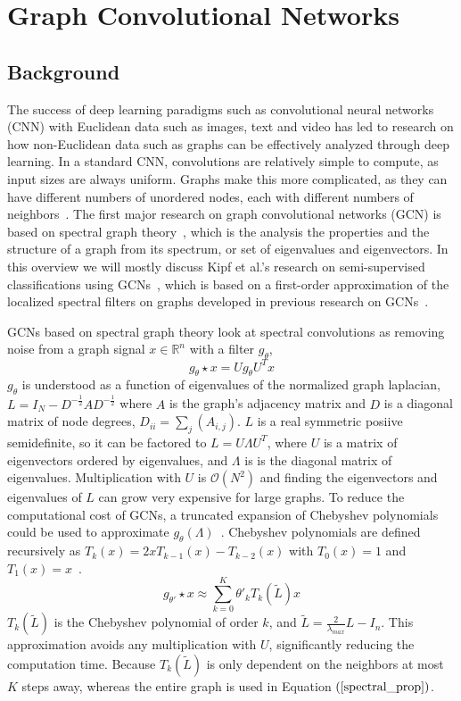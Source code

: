 
\section{Graph Convolutional Networks}

\subsection{Background}
The success of deep learning paradigms such as convolutional neural networks (CNN) with Euclidean data such as images, text and video has led to research on how non-Euclidean data such as graphs can be effectively analyzed through deep learning. In a standard CNN, convolutions are relatively simple to compute, as input sizes are always uniform. Graphs make this more complicated, as they can have different numbers of unordered nodes, each with different numbers of neighbors~\cite{Wu2019}. The first major research on graph convolutional networks (GCN) is based on spectral graph theory~\cite{Bruna2013}, which is the analysis the properties and the structure of a graph from its spectrum, or set of eigenvalues and eigenvectors. In this overview we will mostly discuss Kipf et al.'s research on semi-supervised classifications using GCNs~\cite{Kipf2016}, which is based on a first-order approximation of the localized spectral filters on graphs developed in previous research on GCNs~\cite{Bruna2013}. 

GCNs based on spectral graph theory look at spectral convolutions as removing noise from a graph signal $x \in \mathbb{R}^n$ with a filter $g_\theta$,
\setcounter{equation}{0}
\begin{equation}
\label{spectral_prop}
g_\theta \star x = Ug_\theta U^Tx
\end{equation}
$g_\theta$ is understood as a function of eigenvalues of the normalized graph laplacian, $L = I_N - D^{-\frac{1}{2}}AD^{-\frac{1}{2}}$ where $A$ is the graph's adjacency matrix and $D$ is a diagonal matrix of node degrees, $D_{ii} = \sum_{j} (A_{i,j})$. $L$ is a real symmetric posiive semidefinite, so it can be factored to $L = U\Lambda U^T$, where $U$ is a matrix of eigenvectors ordered by eigenvalues, and $\Lambda$ is is the diagonal matrix of eigenvalues. Multiplication with $U$ is $\mathcal{O}(N^2) $ and finding the eigenvectors and eigenvalues of $L$ can grow very expensive for large graphs. To reduce the computational cost of GCNs, a truncated expansion of Chebyshev polynomials could be used to approximate $g_\theta (\Lambda)$~\cite{Defferrard2016}.
Chebyshev polynomials are defined recursively as $T_k(x) = 2xT_{k-1}(x) - T_{k-2}(x)$ with $T_0(x) = 1$ and $T_1(x) = x$~\cite{Hammond2011}.
\begin{equation}
\label{cheby_prop}
g_{\theta'} \star x \approx \sum\limits_{k=0}^{K} \theta'_k T_k (\tilde{L})x
\end{equation}
$T_k(\tilde{L})$ is the Chebyshev polynomial of order $k$, and $\tilde{L} = \frac{2}{\lambda_{max}} L - I_n$. This approximation avoids any multiplication with $U$, significantly reducing the computation time. Because $T_k(\tilde{L})$ is only dependent on the neighbors at most $K$ steps away, whereas the entire graph is used in Equation $(\ref{spectral_prop})$.

